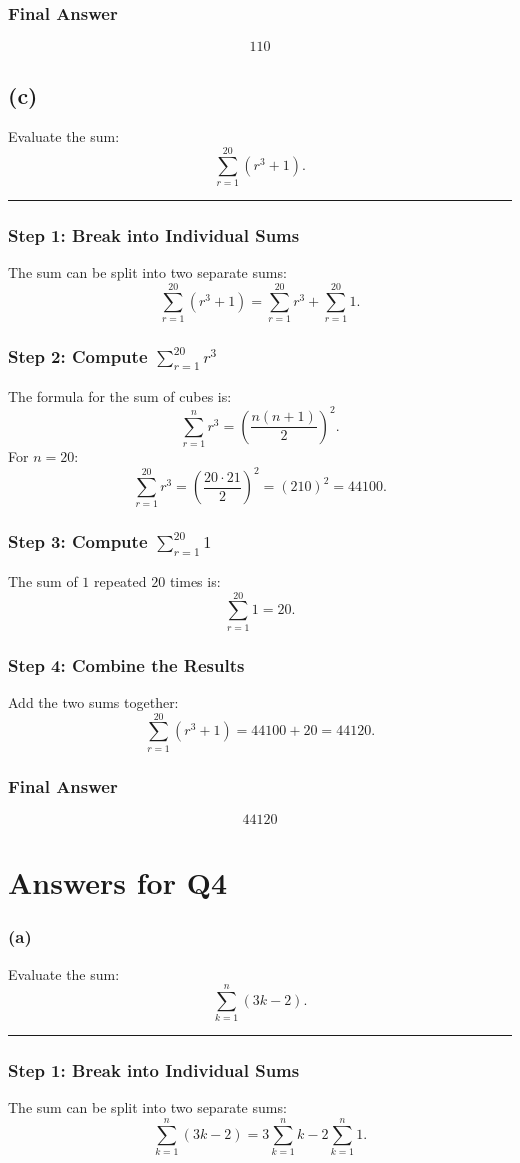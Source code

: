 \documentclass{article}
\newcommand{\HRule}[1]{\rule{\linewidth}{#1}}
\begin{document}
\subsubsection*{Final Answer}
\[
\boxed{110}
\]
\subsection*{(c)}
Evaluate the sum:
\[
\sum_{r=1}^{20} (r^3 + 1).
\]
\HRule{0.5pt}
\subsubsection*{Step 1: Break into Individual Sums}
The sum can be split into two separate sums:
\[
\sum_{r=1}^{20} (r^3 + 1) = \sum_{r=1}^{20} r^3 + \sum_{r=1}^{20} 1.
\]

\subsubsection*{Step 2: Compute \(\sum_{r=1}^{20} r^3\)}
The formula for the sum of cubes is:
\[
\sum_{r=1}^n r^3 = \left(\frac{n(n+1)}{2}\right)^2.
\]
For \(n = 20\):
\[
\sum_{r=1}^{20} r^3 = \left(\frac{20 \cdot 21}{2}\right)^2 = (210)^2 = 44100.
\]

\subsubsection*{Step 3: Compute \(\sum_{r=1}^{20} 1\)}
The sum of \(1\) repeated \(20\) times is:
\[
\sum_{r=1}^{20} 1 = 20.
\]

\subsubsection*{Step 4: Combine the Results}
Add the two sums together:
\[
\sum_{r=1}^{20} (r^3 + 1) = 44100 + 20 = 44120.
\]

\subsubsection*{Final Answer}
\[
\boxed{44120}
\]
\section{Answers for Q4}
\subsubsection*{(a)}
Evaluate the sum:
\[
\sum_{k=1}^{n} (3k - 2).
\]
\HRule{0.5pt}
\subsubsection*{Step 1: Break into Individual Sums}
The sum can be split into two separate sums:
\[
\sum_{k=1}^{n} (3k - 2) = 3 \sum_{k=1}^{n} k - 2 \sum_{k=1}^{n} 1.
\]
\end{document}
